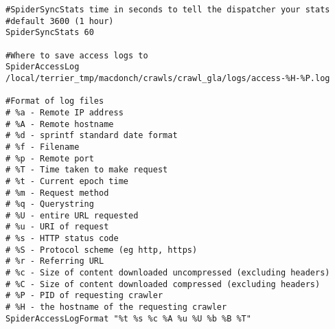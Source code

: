 \begin{verbatim}
#SpiderSyncStats time in seconds to tell the dispatcher your stats
#default 3600 (1 hour)
SpiderSyncStats 60

#Where to save access logs to
SpiderAccessLog /local/terrier_tmp/macdonch/crawls/crawl_gla/logs/access-%H-%P.log

#Format of log files
# %a - Remote IP address
# %A - Remote hostname
# %d - sprintf standard date format
# %f - Filename
# %p - Remote port
# %T - Time taken to make request
# %t - Current epoch time
# %m - Request method
# %q - Querystring
# %U - entire URL requested
# %u - URI of request
# %s - HTTP status code
# %S - Protocol scheme (eg http, https)
# %r - Referring URL
# %c - Size of content downloaded uncompressed (excluding headers)
# %C - Size of content downloaded compressed (excluding headers)
# %P - PID of requesting crawler
# %H - the hostname of the requesting crawler
SpiderAccessLogFormat "%t %s %c %A %u %U %b %B %T"
\end{verbatim}
\renewcommand{\baselinestretch}{1.0}
